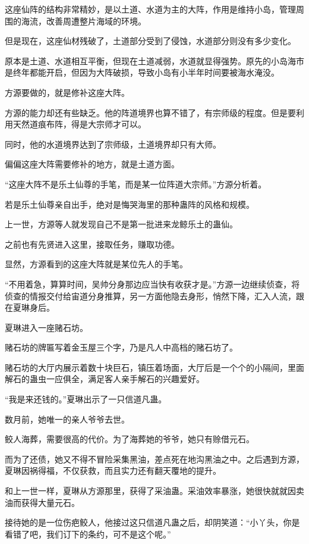 \begin{this_body}
这座仙阵的结构非常精妙，是以土道、水道为主的大阵，作用是维持小岛，管理周围的海流，改善周遭整片海域的环境。

但是现在，这座仙材残破了，土道部分受到了侵蚀，水道部分则没有多少变化。

原本是土道、水道相互平衡，但现在土道减弱，水道就显得强势。原先的小岛海市是终年都能开启，但因为大阵破损，导致小岛有小半年时间要被海水淹没。

方源要做的，就是修补这座大阵。

方源的能力却还有些缺乏。他的阵道境界也算不错了，有宗师级的程度。但是要利用天然道痕布阵，得是大宗师才可以。

同时，他的水道境界达到了宗师级，土道境界却只有大师。

偏偏这座大阵需要修补的地方，就是土道方面。

“这座大阵不是乐土仙尊的手笔，而是某一位阵道大宗师。”方源分析着。

若是乐土仙尊亲自出手，绝对是悔哭海里的那种蛊阵的风格和规模。

上一世，方源等人就发现自己不是第一批进来龙鲸乐土的蛊仙。

之前也有先贤进入这里，接取任务，赚取功德。

显然，方源看到的这座大阵就是某位先人的手笔。

“不用着急，算算时间，吴帅分身那边应当快有收获才是。”方源一边继续侦查，将侦查的情报交付给宙道分身推算，另一方面他隐去身形，悄然下降，汇入人流，跟在夏琳身后。

夏琳进入一座赌石坊。

赌石坊的牌匾写着金玉屋三个字，乃是凡人中高档的赌石坊了。

赌石坊的大厅内展示着数十块巨石，镇压着场面，大厅后是一个个的小隔间，里面解石的蛊虫一应俱全，满足客人亲手解石的兴趣爱好。

“我是来还钱的。”夏琳出示了一只信道凡蛊。

数月前，她唯一的亲人爷爷去世。

鲛人海葬，需要很高的代价。为了海葬她的爷爷，她只有赊借元石。

而为了还债，她又不得不冒险采集黑油，差点死在地沟黑油之中。之后遇到方源，夏琳因祸得福，不仅获救，而且实力还有翻天覆地的提升。

和上一世一样，夏琳从方源那里，获得了采油蛊。采油效率暴涨，她很快就就因卖油而获得大量元石。

接待她的是一位伤疤鲛人，他接过这只信道凡蛊之后，却阴笑道：“小丫头，你是看错了吧，我们订下的条约，可不是这个呢。”


\end{this_body}
